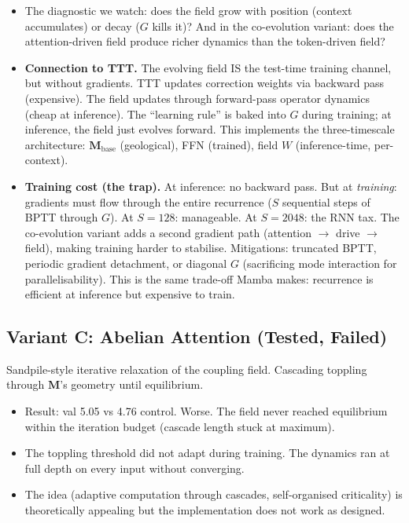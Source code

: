 \documentclass[11pt, a4paper]{article}
\newcommand{\M}{\mathbf{M}}
\theoremstyle{plain}
\theoremstyle{definition}
\theoremstyle{remark}
\begin{document}
\begin{itemize}[nosep]
We \emph{keep} attention but borrow the SSM's context compression dynamics.
The field evolves like an SSM state, but feeds INTO attention rather than replacing it.
Attention quality + SSM compression.
\item The diagnostic we watch: does the field grow with position (context accumulates) or decay ($G$ kills it)? And in the co-evolution variant: does the attention-driven field produce richer dynamics than the token-driven field?
\item \textbf{Connection to TTT.} The evolving field IS the test-time training channel, but without gradients.
TTT updates correction weights via backward pass (expensive).
The field updates through forward-pass operator dynamics (cheap at inference).
The ``learning rule'' is baked into $G$ during training; at inference, the field just evolves forward.
This implements the three-timescale architecture: $\M_{\mathrm{base}}$ (geological), FFN (trained), field $W$ (inference-time, per-context).
\item \textbf{Training cost (the trap).} At inference: no backward pass. But at \emph{training}: gradients must flow through the entire recurrence ($S$ sequential steps of BPTT through $G$).
At $S = 128$: manageable. At $S = 2048$: the RNN tax. The co-evolution variant adds a second gradient path (attention $\to$ drive $\to$ field), making training harder to stabilise.
Mitigations: truncated BPTT, periodic gradient detachment, or diagonal $G$ (sacrificing mode interaction for parallelisability).
This is the same trade-off Mamba makes: recurrence is efficient at inference but expensive to train.
\end{itemize}

\subsection{Variant C: Abelian Attention (Tested, Failed)}

Sandpile-style iterative relaxation of the coupling field.
Cascading toppling through $\M$'s geometry until equilibrium.
\begin{itemize}[nosep]
\item Result: val 5.05 vs 4.76 control. Worse. The field never reached equilibrium within the iteration budget (cascade length stuck at maximum).
\item The toppling threshold did not adapt during training. The dynamics ran at full depth on every input without converging.
\item The idea (adaptive computation through cascades, self-organised criticality) is theoretically appealing but the implementation does not work as designed.
\end{itemize}
\end{document}
